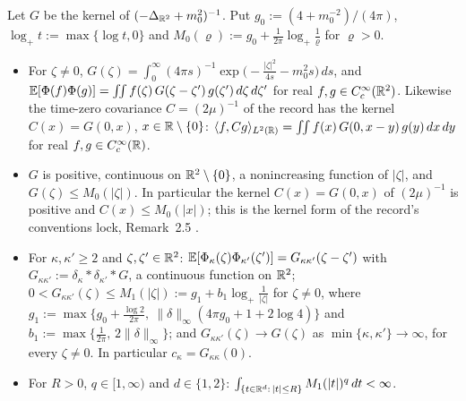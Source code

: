 \begin{auxlemma}\label{aux:d1-cov}
Let $G$ be the kernel of $(-\Delta_{\mathbb{R}^2}+m_0^2)^{-1}$. Put $g_0:=(4+m_0^{-2})/(4\pi)$,
$\log_+t:=\max\{\log t,0\}$ and $M_0(\varrho):=g_0+\frac1{2\pi}\log_+\frac1\varrho$ for
$\varrho>0$.
\begin{itemize}
\item[(i)] For $\zeta\ne0$,
$G(\zeta)=\int_0^\infty(4\pi s)^{-1}\exp\bigl(-\frac{|\zeta|^2}{4s}-m_0^2s\bigr)\,ds$, and
$\mathbb{E}[\Phi(f)\Phi(g)]=\iint f(\zeta)\,G(\zeta-\zeta')\,g(\zeta')\,d\zeta\,d\zeta'$ for real
$f,g\in C_c^\infty(\mathbb{R}^2)$. Likewise the time-zero covariance $C=(2\mu)^{-1}$ of the record
has the kernel $C(x)=G(0,x)$, $x\in\mathbb{R}\setminus\{0\}$:
$\langle f,Cg\rangle_{L^2(\mathbb{R})}=\iint f(x)\,G(0,x-y)\,g(y)\,dx\,dy$ for real $f,g\in C_c^\infty(\mathbb{R})$.
\item[(ii)] $G$ is positive, continuous on $\mathbb{R}^2\setminus\{0\}$, a nonincreasing function of
$|\zeta|$, and $G(\zeta)\le M_0(|\zeta|)$. In particular the kernel $C(x)=G(0,x)$ of
$(2\mu)^{-1}$ is positive and $C(x)\le M_0(|x|)$; this is the kernel form of the record's
conventions lock, Remark~2.5 \cite[p.~14]{R}.
\item[(iii)] For $\kappa,\kappa'\ge2$ and $\zeta,\zeta'\in\mathbb{R}^2$:
$\mathbb{E}[\Phi_\kappa(\zeta)\Phi_{\kappa'}(\zeta')]=G_{\kappa\kappa'}(\zeta-\zeta')$ with
$G_{\kappa\kappa'}:=\delta_\kappa*\delta_{\kappa'}*G$, a continuous function on $\mathbb{R}^2$;
$0<G_{\kappa\kappa'}(\zeta)\le M_1(|\zeta|):=g_1+b_1\log_+\frac1{|\zeta|}$ for $\zeta\ne0$,
where
$g_1:=\max\bigl\{g_0+\frac{\log2}{2\pi},\ \|\delta\|_\infty(4\pi g_0+1+2\log4)\bigr\}$ and
$b_1:=\max\{\frac1{2\pi},\,2\|\delta\|_\infty\}$; and
$G_{\kappa\kappa'}(\zeta)\to G(\zeta)$ as $\min\{\kappa,\kappa'\}\to\infty$, for every
$\zeta\ne0$. In particular $c_\kappa=G_{\kappa\kappa}(0)$.
\item[(iv)] For $R>0$, $q\in[1,\infty)$ and $d\in\{1,2\}$:
$\int_{\{t\in\mathbb{R}^d:\,|t|\le R\}}M_1(|t|)^q\,dt<\infty$.
\end{itemize}
\end{auxlemma}

